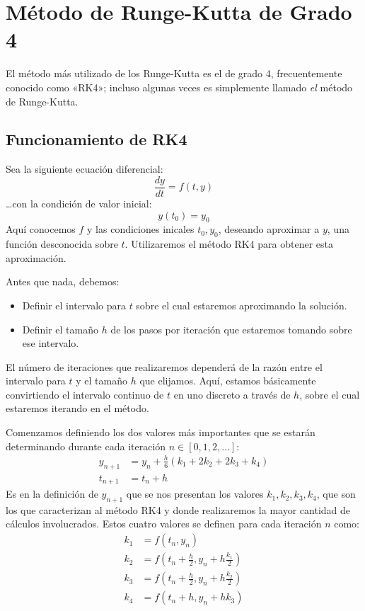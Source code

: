 \section{Método de Runge-Kutta de Grado 4}

El método más utilizado de los Runge-Kutta es el de grado 4, frecuentemente conocido como «RK4»; incluso algunas veces es simplemente llamado \textit{el} método de Runge-Kutta.

\subsection{Funcionamiento de RK4}\label{sect:def-rk4}

Sea la siguiente ecuación diferencial:
\begin{equation} \label{eq:main-diff-eq}
	\frac{dy}{dt} = f(t,y)
\end{equation}
…con la condición de valor inicial:
\begin{equation*}
	y(t_0) = y_0
\end{equation*}
Aquí conocemos \(f\) y las condiciones inicales \(t_0, y_0\), deseando aproximar a \(y\), una función desconocida sobre \(t\). Utilizaremos el método RK4 para obtener esta aproximación.

Antes que nada, debemos:
\begin{itemize}
	\item Definir el intervalo para \(t\) sobre el cual estaremos aproximando la solución.
	\item Definir el tamaño \(h\) de los pasos por iteración que estaremos tomando sobre ese intervalo.
\end{itemize}
El número de iteraciones que realizaremos dependerá de la razón entre el intervalo para \(t\) y el tamaño \(h\) que elijamos. Aquí, estamos básicamente convirtiendo el intervalo continuo de \(t\) en uno discreto a través de \(h\), sobre el cual estaremos iterando en el método.

Comenzamos definiendo los dos valores más importantes que se estarán determinando durante cada iteración \(n \in [0, 1, 2, \dots]\):
\begin{align}
	y_{n+1} &= y_{n} + \frac{h}{6} \left( k_{1} + 2k_{2} + 2k_{3} + k_{4} \right) \label{eq:weighted-avg} \\[0.5em]
	t_{n+1} &= t_{n} + h \nonumber
\end{align}
Es en la definición de \(y_{n+1}\) que se nos presentan los valores \(k_{1}, k_{2}, k_{3}, k_{4}\), que son los que caracterizan al método RK4 y donde realizaremos la mayor cantidad de cálculos involucrados. Estos cuatro valores se definen para cada iteración \(n\) como:
\begin{align}
	k_{1} &= f(t_{n}, y_{n}) \label{eq:k1} \\
	k_{2} &= f \left( t_{n} + \frac{h}{2}, y_{n} + h \frac{k_{1}}{2} \right) \label{eq:k2} \\
	k_{3} &= f \left( t_{n} + \frac{h}{2}, y_{n} + h \frac{k_{2}}{2} \right) \label{eq:k3} \\
	k_{4} &= f(t_{n} + h, y_{n} + hk_{3}) \label{eq:k4}
\end{align}

